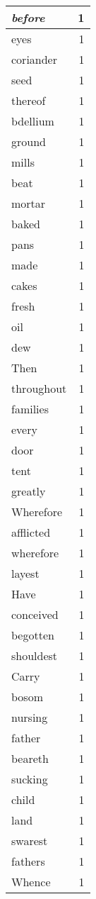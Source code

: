 \begin{center}
\begin{longtable}{l|r}
\emph{before} & 1 \\ \hline
eyes & 1 \\ \hline
coriander & 1 \\ \hline
seed & 1 \\ \hline
thereof & 1 \\ \hline
bdellium & 1 \\ \hline
ground & 1 \\ \hline
mills & 1 \\ \hline
beat & 1 \\ \hline
mortar & 1 \\ \hline
baked & 1 \\ \hline
pans & 1 \\ \hline
made & 1 \\ \hline
cakes & 1 \\ \hline
fresh & 1 \\ \hline
oil & 1 \\ \hline
dew & 1 \\ \hline
Then & 1 \\ \hline
throughout & 1 \\ \hline
families & 1 \\ \hline
every & 1 \\ \hline
door & 1 \\ \hline
tent & 1 \\ \hline
greatly & 1 \\ \hline
Wherefore & 1 \\ \hline
afflicted & 1 \\ \hline
wherefore & 1 \\ \hline
layest & 1 \\ \hline
Have & 1 \\ \hline
conceived & 1 \\ \hline
begotten & 1 \\ \hline
shouldest & 1 \\ \hline
Carry & 1 \\ \hline
bosom & 1 \\ \hline
nursing & 1 \\ \hline
father & 1 \\ \hline
beareth & 1 \\ \hline
sucking & 1 \\ \hline
child & 1 \\ \hline
land & 1 \\ \hline
swarest & 1 \\ \hline
fathers & 1 \\ \hline
Whence & 1 \\ \hline

\end{longtable}
\end{center}
